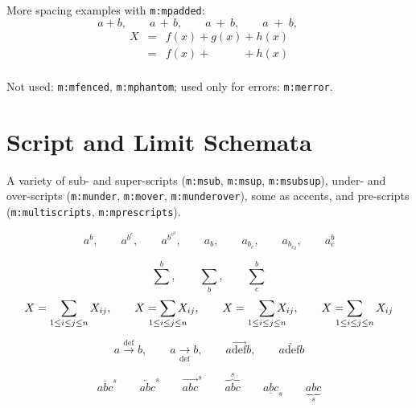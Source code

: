 \documentclass{article}
\newcommand{\mml}[1]{\texttt{m:#1}}
\begin{document}
More spacing examples with \mml{mpadded}:
\begin{equation}
  a+b, \qquad
  a \,+\, b, \qquad
  a \>+\> b, \qquad
  a \;+\; b, \qquad
\end{equation}
\begin{eqnarray}
  X &=& f(x) + g(x) + h(x) \\
    &=& f(x) + \phantom{g(x)} + h(x) \\
\end{eqnarray}

Not used: \mml{mfenced}, \mml{mphantom};
used only for errors: \mml{merror}.

\section{Script and Limit Schemata}
A variety of sub- and super-scripts (\mml{msub}, \mml{msup}, \mml{msubsup}),
under- and over-scripts (\mml{munder}, \mml{mover}, \mml{munderover}),
some as accents, and pre-scripts (\mml{multiscripts}, \mml{mprescripts}).

\begin{equation}
 a^{b},\qquad
 a^{b^{c}},\qquad
 a^{b^{c^{d}}},\qquad
 a_{b},\qquad
 a_{b_{c}},\qquad
 a_{b_{c_ {d}}},\qquad
 a^{b}_{c}
\end{equation}

\begin{equation}
 \sum^{b},\qquad
 \sum_{b},\qquad
 \sum^{b}_{c}
\end{equation}
\begin{equation}
X = \sum_{1\le i \le j \le n} X_{ij},\qquad
X = \sum_{\mathclap{1\le i \le j \le n}} X_{ij},\qquad
X = \smashoperator[r]{\sum_{1\le i \le j \le n}} X_{ij},\qquad
X = \smashoperator[l]{\sum_{1\le i \le j \le n}} X_{ij}
\end{equation}

\begin{equation}
 a \overset{\mathrm{def}}{\rightarrow} b, \qquad
 a \underset{\mathrm{def}}{\rightarrow} b,\qquad
 a \overrightarrow{\mathrm{def}} b,\qquad
 a \underrightarrow{\mathrm{def}} b
\end{equation}

\begin{equation}
  \overline{abc}^s \qquad
  \overleftarrow{abc}^s \qquad
  \overrightarrow{abc}^s \qquad
  \overbrace{abc}^s \qquad
  \underline{abc}_s \qquad
  \underbrace{abc}_s
\end{equation}
\end{document}
